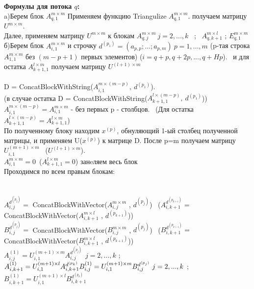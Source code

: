 \documentclass[a4paper,12pt]{article}
\begin{document}
\textbf{ Формулы для потока $q$:} \\

\hspace{0.25cm} a)Берем блок $A_{q,1}^{m\times m}$ Применяем функцию Triangulize $A_{q,1}^{m\times m} $. получаем матрицу $U^{m\times m}$. \\
Далее, применяем матрицу $U^{m\times m}$ к блокам $A_{q,j}^{m\times m} \ j = 2,...,k$ \ ; \ $A_{q,k+1}^{m\times l} $ ; $E_{q,1}^{m\times m}$ \\

\hspace{0.25cm} б)Берем блок $A_{i,1}^{{m\times m}}$ и строчку $d^{(p_{1})} = (a_{p,p};...;a_{p,m}) \ p = 1,...,m$  (p-тая строка $A_{1,1}^{m\times m} $ без $(m-p+1)$ первых элементов) ($i = q + p, q+2p,..., q+Hp$). \ и для остатка $A_{k+1,1}^{{l\times m}}$ получаем матрицу $U^{(l+1)\times m}$\\\\
D = ConcatBlockWithString($A_{i,1}^{{m\times (m-p)}}, \ d^{(p_{1})}$).\\ 
(в случае остатка D = ConcatBlockWithString($A_{k+1,1}^{{l\times (m-p)}}, \ d^{(p_{1})}$))\\
$A_{i,1}^{m\times (m-p)} = A_{i,1}^{m\times m}$ - без первых p - столбцов. \ (Для остатка $A_{k+1,1}^{l\times (m-p)} = A_{k+1,1}^{l\times m}$)\\
 По полученному блоку находим $x^{(p)}$, обнуляющий 1-ый столбец полученной матрицы, и применяем U($x^{(p)}$) к матрице D. После p=m получаем матрицу $U_{i,1}^{(m+1)\times m}$ \ ($U^{(l+1)\times m}$).\\
$A_{i,1}^{{m\times m}} = 0$\  ($A_{k+1,1}^{{l\times m}} = 0$) занeляем весь блок \\
Проходимся по всем правым блокам:\\
\\\\$A_{i,j}^{d^{(p_{j})}} =$  ConcatBlockWithVector($A_{i,j}^{m\times m}$ , $d^{(p_{j})}$) \ ($A_{i,k+1}^{d^{(p_{k+1})}} = $   ConcatBlockWithVector($A_{i,k+1}^{m\times l}$ , $d^{(p_{k+1})}$)) \\

$B_{i,j}^{d^{(p_{j})}} = $ ConcatBlockWithVector($B_{i,j}^{m\times m}$ , $d^{(p_{j})}$) \ 
($B_{i,k+1}^{d^{(p_{k+1})}} = $   ConcatBlockWithVector($B_{i,k+1}^{m\times l}$ , $d^{(p_{k+1})}$))\\

$A_{i,j}^{(1)} = U_{i,1}^{(m+1)\times m} A_{i,j}^{d^{(p_{j})}} \ \ j = 2,...,k$ ;  $A_{i,k+1}^{(1)} = U_{i,1}^{(m+1)\times l} A_{i, k+1}^{d^{(p_{k})}} \\ B_{i,j}^{(1)} = U_{i,1}^{(m+1)\times m} B_{i,j}^{d^{(p_{j})}} \  j = 2,...,k$ ;  $B_{i,k+1}^{(1)} = U_{i,1}^{(m+1)\times l} B_{i, k+1}^{d^{(p_{k})}} $\\\\
\end{document}
